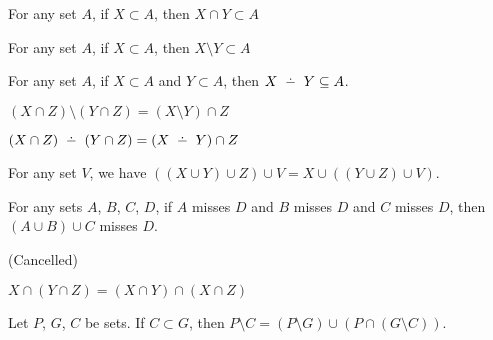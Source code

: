 \documentclass{article}
\begin{document}
\begin{thm}
\item\label{xboole1:108} For any set $A$, if $X \subset A$, then $X \cap Y \subset A$
\item\label{xboole1:109} For any set $A$, if $X \subset A$, then $X \setminus Y \subset A$
\item\label{xboole1:110} For any set $A$, if $X \subset A$ and $Y \subset A$, then
$X \symdiff Y \subset A$.
\item\label{xboole1:111} $(X \cap Z) \setminus (Y \cap Z) = (X \setminus Y) \cap Z$
\item\label{xboole1:112} $(X \cap Z) \symdiff (Y \cap Z) = (X \symdiff Y) \cap Z$
\item\label{xboole1:113} For any set $V$, we have $((X \cup Y) \cup Z) \cup V = X \cup ((Y \cup Z) \cup V)$.
\item\label{xboole1:114} For any sets $A$, $B$, $C$, $D$, if $A$ misses
  $D$ and $B$ misses $D$ and $C$ misses $D$, then $(A\cup B)\cup C$
  misses $D$.
\item\label{xboole1:115} (Cancelled)
\item\label{xboole1:116} $X \cap (Y \cap Z) = (X \cap Y) \cap (X \cap Z)$
\item\label{xboole1:117} Let $P$, $G$, $C$ be sets. If $C\subset G$,
  then $P\setminus C = (P\setminus G)\cup (P\cap(G\setminus C))$.
\end{thm}
\end{document}

